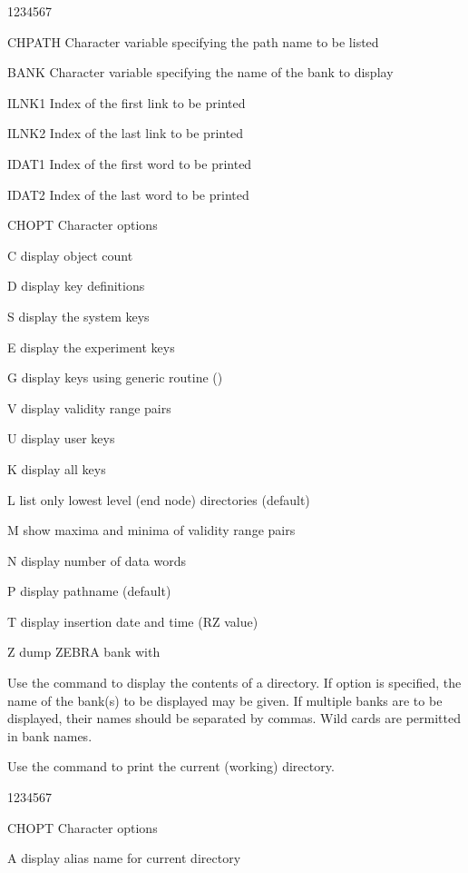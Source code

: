 \begin{DLtt}{1234567}
\item[CHPATH]Character variable specifying the path name to be listed
\item[BANK]Character variable specifying the name of the bank to display
\item[ILNK1]Index of the first link to be printed
\item[ILNK2]Index of the last link to be printed
\item[IDAT1]Index of the first word to be printed
\item[IDAT2]Index of the last word to be printed
\item[CHOPT]Character options
  \begin{DLtt}{1}
    \item[C]display object count
    \item[D]display key definitions
    \item[S]display the system keys
    \item[E]display the experiment keys
    \item[G]display keys using generic routine ()
    \item[V]display validity range pairs
    \item[U]display user keys
    \item[K]display all keys
    \item[L]list only lowest level (end node) directories (default)
    \item[M]show maxima and minima of validity range pairs
    \item[N]display number of data words
    \item[P]display pathname (default)
    \item[T]display insertion date and time (RZ value)
    \item[Z]dump ZEBRA bank with 
  \end{DLtt}
\end{DLtt}

Use the  command to display the contents of a directory.
If option  is specified, the name of the bank(s) to be displayed
may be given. If multiple banks are to be displayed, their names
should be separated by commas. Wild cards are permitted in
bank names.


Use the  command to print the current (working) directory.
\begin{DLtt}{1234567}
\item[CHOPT]Character options
  \begin{DLtt}{1}
    \item[A]display alias name for current directory
  \end{DLtt}
\end{DLtt}

